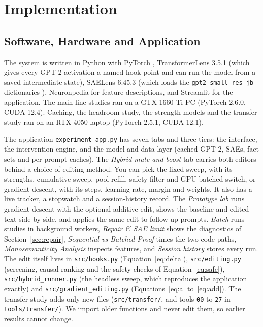 \chapter{Implementation}\label{ch:implementation}

\section{Software, Hardware and Application}

The system is written in Python with PyTorch \cite{r22}, TransformerLens 3.5.1 \cite{r13} (which gives every GPT-2 activation a named hook point and can run the model from a saved intermediate state), SAELens 6.45.3 \cite{r14} (which loads the \texttt{gpt2-small-res-jb} dictionaries \cite{r15}), Neuronpedia \cite{r20} for feature descriptions, and Streamlit for the application. The main-line studies ran on a GTX 1660 Ti PC (PyTorch 2.6.0, CUDA 12.4). Caching, the headroom study, the strength models and the transfer study ran on an RTX 4050 laptop (PyTorch 2.5.1, CUDA 12.1).

The application \texttt{experiment\_app.py} has seven tabs and three tiers: the interface, the intervention engine, and the model and data layer (cached GPT-2, SAEs, fact sets and per-prompt caches). The \emph{Hybrid mute and boost} tab carries both editors behind a choice of editing method. You can pick the fixed sweep, with its strengths, cumulative sweep, pool refill, safety filter and GPU-batched switch, or gradient descent, with its steps, learning rate, margin and weights. It also has a live tracker, a stopwatch and a session-history record. The \emph{Prototype lab} runs gradient descent with the optional additive edit, shows the baseline and edited text side by side, and applies the same edit to follow-up prompts. \emph{Batch} runs studies in background workers, \emph{Repair \& SAE limit} shows the diagnostics of Section~\ref{sec:repair}, \emph{Sequential vs Batched Proof} times the two code paths, \emph{Monosemanticity Analysis} inspects features, and \emph{Session history} stores every run. The edit itself lives in \texttt{src/hooks.py} (Equation~\ref{eq:delta}), \texttt{src/editing.py} (screening, causal ranking and the safety checks of Equation~\ref{eq:safe}), \texttt{src/hybrid\_runner.py} (the headless sweep, which reproduces the application exactly) and \texttt{src/gradient\_editing.py} (Equations~\ref{eq:a} to~\ref{eq:add}). The transfer study adds only new files (\texttt{src/transfer/}, and tools \texttt{00} to \texttt{27} in \texttt{tools/transfer/}). We import older functions and never edit them, so earlier results cannot change.

